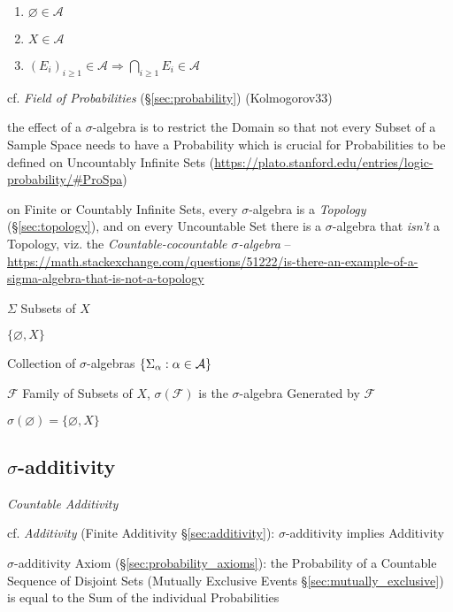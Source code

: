 \begin{enumerate}
  \item $\varnothing \in \mathcal{A}$
  \item $X \in \mathcal{A}$
  \item $(E_i)_{i \geq 1} \in \mathcal{A} \Rightarrow
    \bigcap_{i \geq 1} E_i \in \mathcal{A}$
\end{enumerate}

cf. \emph{Field of Probabilities} (\S\ref{sec:probability}) (Kolmogorov33)

the effect of a $\sigma$-algebra is to restrict the Domain so that not every
Subset of a Sample Space needs to have a Probability which is crucial for
Probabilities to be defined on Uncountably Infinite Sets
(\url{https://plato.stanford.edu/entries/logic-probability/#ProSpa})

\fist on Finite or Countably Infinite Sets, every $\sigma$-algebra is a
\emph{Topology} (\S\ref{sec:topology}), and on every Uncountable Set there is a
$\sigma$-algebra that \emph{isn't} a Topology, viz. the
\emph{Countable-cocountable $\sigma$-algebra}
--\url{https://math.stackexchange.com/questions/51222/is-there-an-example-of-a-sigma-algebra-that-is-not-a-topology}

$\Sigma$ Subsets of $X$

$\{ \varnothing, X \}$

Collection of $\sigma$-algebras $\{ \Sigma_\alpha : \alpha \in \mathcal{A} \}$

$\mathcal{F}$ Family of Subsets of $X$, $\sigma(\mathcal{F})$ is the
$\sigma$-algebra Generated by $\mathcal{F}$

$\sigma(\varnothing) = \{ \varnothing, X \}$



\subsection{$\sigma$-additivity}\label{sec:sigma_additivity}

\emph{Countable Additivity}

cf. \emph{Additivity} (Finite Additivity \S\ref{sec:additivity}):
$\sigma$-additivity implies Additivity

\fist $\sigma$-additivity Axiom (\S\ref{sec:probability_axioms}): the
Probability of a Countable Sequence of Disjoint Sets (Mutually Exclusive Events
\S\ref{sec:mutually_exclusive}) is equal to the Sum of the individual
Probabilities

